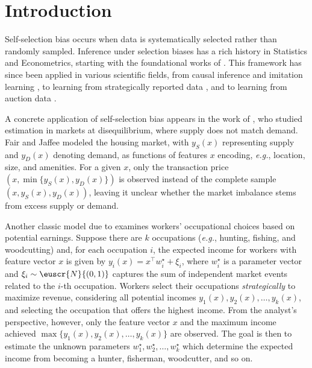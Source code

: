 \documentclass[11pt,letterpaper]{article}
\theoremstyle{plain}
\theoremstyle{definition}
\theoremstyle{remark}
\newcommand{\inparen}[1]{\ensuremath{\left(#1\right)}}
\newcommand{\customcal}[1]{\euscr{#1}}
\newcommand{\cN}{\customcal{N}}
\newcommand{\eg}{\emph{e.g.}}
\newcommand{\normal}[2]{\cN{\inparen{#1,#2}}}
\begin{document}
\section{Introduction}
    Self-selection bias occurs when data is systematically selected rather than randomly sampled.
    Inference under selection biases has a rich history in Statistics and Econometrics, starting with the foundational works of \citet{roy1951earnings,willis1979education,heckman1979sample}.
    {This framework has since been applied in} various scientific fields, from causal inference and imitation learning \cite{heckman1990varieties}, to learning from strategically reported data \cite{hardt2016strategic,dong2018strategic,kleinberg2020classifiers}, and to learning from auction data \cite{athey2002identification,athey2007nonparametric,cherapanamjeri2022auctionEstimation}.
    
    A concrete application of self-selection bias appears in the work of \citet{fair1972methods}, who studied estimation in markets at disequilibrium, where supply does not match demand.
    Fair and Jaffee modeled the housing market, with $y_S(x)$ representing supply and $y_D(x)$ {denoting} demand, as {functions} of {features} $x$ encoding, \eg{}, location, size, and amenities. 
    For a given $x$, {only the transaction price} $(x,\min\{y_S(x), y_D(x)\})$ {is observed} instead of the complete sample $(x,y_S(x),y_D(x))$, 
    leaving it unclear whether the market imbalance stems from excess supply or demand.

    Another classic model due to \citet{roy1951earnings} examines workers' occupational choices based on potential earnings.
    Suppose there are $k$ occupations (\eg{}, hunting, fishing, and woodcutting) and, for each occupation $i$, the expected income for workers with feature vector $x$ is given by $y_i(x)=x^\top w_i^\star + \xi_i$, 
    where $w_i^\star$ is a parameter vector and $\xi_i \sim \normal{0}{1}$ {captures} the sum of independent market events related to the $i$-th occupation.
    {Workers} select their occupations \textit{strategically} to maximize revenue, considering all potential incomes $y_1(x), y_2(x),\dots, y_k(x)$, and selecting the occupation that offers the highest income.
    From the analyst's perspective, however,
    only the feature vector $x$ and the maximum income achieved $\max \{y_1(x), y_2(x), \dots, y_k(x)\}$ are observed.
    The goal is {then} to estimate the unknown parameters $w^\star_1,w^\star_2,\dots,w^\star_k$ {which determine the expected income from becoming a hunter, fisherman, woodcutter, and so on.} 
    
\end{document}
